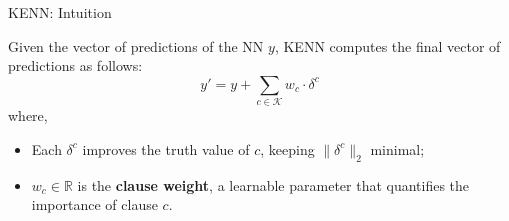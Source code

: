 \documentclass{beamer}
\begin{document}

%		



\begin{frame}{KENN: Intuition}

Given the vector of predictions of the NN $y$, KENN computes the final vector of predictions as follows: $$y' = y +\sum_{c\in \mathcal{K}} w_c \cdot \delta^c$$
		where,
		\begin{itemize}
			\item Each $\delta^c$ improves the truth value of $c$, keeping $\|\delta^c\|_2$ minimal;
				\item $w_c \in \mathbb{R}$ is the \textbf{clause weight}, a learnable parameter that quantifies the importance of clause $c$.
		\end{itemize}

	
	
\end{frame}
\end{document}
